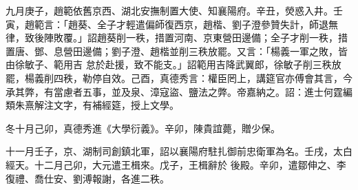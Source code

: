 \begin{pinyinscope}
 九月庚子，趙範依舊京西、湖北安撫制置大使、知襄陽府。辛丑，熒惑入井。壬寅，趙範言：「趙葵、全子才輕遣偏師復西京，趙楷、劉子澄參贊失計，師退無律，致後陣敗覆。」詔趙葵削一秩，措置河南、京東營田邊備；全子才削一秩，措置唐、鄧、息營田邊備；劉子澄、趙楷並削三秩放罷。又言：「楊義一軍之敗，皆由徐敏子、範用吉
 怠於赴援，致不能支。」詔範用吉降武翼郎，徐敏子削三秩放罷，楊義削四秩，勒停自效。己酉，真德秀言：權臣罔上，講筵官亦傅會其言，今承其弊，有當慮者五事，並及泉、漳寇盜、鹽法之弊。帝嘉納之。詔：進士何霆編類朱熹解注文字，有補經筵，授上文學。



 冬十月己卯，真德秀進《大學衍義》。辛卯，陳貴誼薨，贈少保。



 十一月壬子，京、湖制司創鎮北軍，詔以襄陽府駐扎御前忠衛軍為名。壬戌，太白經天。十二月己卯，大元遣王楫來。戊子，王楫辭於
 後殿。辛卯，遣鄒伸之、李復禮、喬仕安、劉溥報謝，各進二秩。



\end{pinyinscope}
